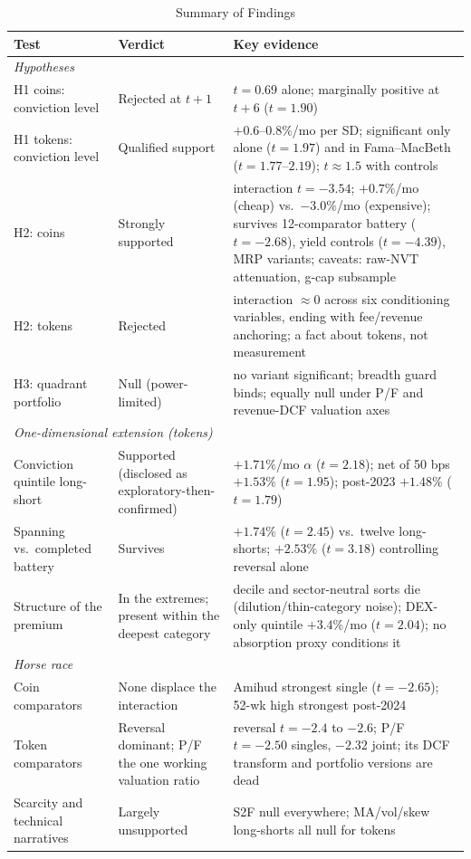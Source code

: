 \documentclass[12pt]{article}
\begin{document}
\begin{table}[ht]
\centering
\caption{Summary of Findings}
\label{tab:scorecard}
\footnotesize
\setlength{\tabcolsep}{4pt}
\begin{tabular}{p{4.1cm}p{5.1cm}p{5.6cm}}
\toprule
Test & Verdict & Key evidence \\
\midrule
\multicolumn{3}{l}{\textit{Hypotheses}} \\
H1 coins: conviction level & Rejected at $t{+}1$ & $t=0.69$ alone; marginally positive at $t{+}6$ ($t=1.90$) \\
H1 tokens: conviction level & Qualified support & $+0.6$--$0.8\%$/mo per SD; significant only alone ($t=1.97$) and in Fama--MacBeth ($t=1.77$--$2.19$); $t \approx 1.5$ with controls \\
H2: coins & Strongly supported & interaction $t=-3.54$; $+0.7\%$/mo (cheap) vs.\ $-3.0\%$/mo (expensive); survives 12-comparator battery ($t=-2.68$), yield controls ($t=-4.39$), MRP variants; caveats: raw-NVT attenuation, g-cap subsample \\
H2: tokens & Rejected & interaction $\approx 0$ across six conditioning variables, ending with fee/revenue anchoring; a fact about tokens, not measurement \\
H3: quadrant portfolio & Null (power-limited) & no variant significant; breadth guard binds; equally null under P/F and revenue-DCF valuation axes \\
\midrule
\multicolumn{3}{l}{\textit{One-dimensional extension (tokens)}} \\
Conviction quintile long-short & Supported (disclosed as exploratory-then-confirmed) & $+1.71\%$/mo $\alpha$ ($t=2.18$); net of 50 bps $+1.53\%$ ($t=1.95$); post-2023 $+1.48\%$ ($t=1.79$) \\
Spanning vs.\ completed battery & Survives & $+1.74\%$ ($t=2.45$) vs.\ twelve long-shorts; $+2.53\%$ ($t=3.18$) controlling reversal alone \\
Structure of the premium & In the extremes; present within the deepest category & decile and sector-neutral sorts die (dilution/thin-category noise); DEX-only quintile $+3.4\%$/mo ($t=2.04$); no absorption proxy conditions it \\
\midrule
\multicolumn{3}{l}{\textit{Horse race}} \\
Coin comparators & None displace the interaction & Amihud strongest single ($t=-2.65$); 52-wk high strongest post-2024 \\
Token comparators & Reversal dominant; P/F the one working valuation ratio & reversal $t=-2.4$ to $-2.6$; P/F $t=-2.50$ singles, $-2.32$ joint; its DCF transform and portfolio versions are dead \\
Scarcity and technical narratives & Largely unsupported & S2F null everywhere; MA/vol/skew long-shorts all null for tokens \\
\bottomrule
\end{tabular}
\end{table}
\end{document}
